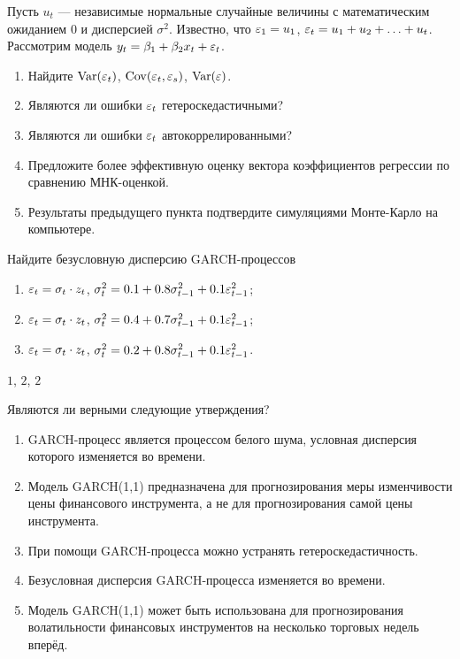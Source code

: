 \begin{problem}
Пусть $u_t$ — независимые нормальные случайные величины с
математическим ожиданием $0$ и дисперсией $\sigma^2$. Известно, что $\varepsilon_1=u_1$, $\varepsilon_t=u_1+u_2+\ldots+u_t$. Рассмотрим модель $y_t=\beta_1+\beta_2 x_t + \varepsilon_t$.

\begin{enumerate}
\item Найдите $\operatorname{Var}(\varepsilon_t)$, $\operatorname{Cov}(\varepsilon_t,\varepsilon_s)$, $\operatorname{Var}(\varepsilon)$.
\item Являются ли ошибки $\varepsilon_t$ гетероскедастичными?
\item Являются ли ошибки $\varepsilon_t$ автокоррелированными?
\item Предложите более эффективную оценку вектора коэффициентов регрессии по сравнению МНК-оценкой.
\item Результаты предыдущего пункта подтвердите симуляциями Монте-Карло на компьютере.
\end{enumerate}


\begin{sol}
\end{sol}
\end{problem}



\begin{problem}
Найдите безусловную дисперсию GARCH-процессов
\begin{enumerate}
\item $\varepsilon_t=\sigma_t \cdot z_t$, $\sigma^2_t=0.1+0.8\sigma^2_{t-1}+0.1\varepsilon^2_{t-1}$;
\item $\varepsilon_t=\sigma_t \cdot z_t$, $\sigma^2_t=0.4+0.7\sigma^2_{t-1}+0.1\varepsilon^2_{t-1}$;
\item $\varepsilon_t=\sigma_t \cdot z_t$, $\sigma^2_t=0.2+0.8\sigma^2_{t-1}+0.1\varepsilon^2_{t-1}$.
\end{enumerate}


\begin{sol}
$1$, $2$, $2$
\end{sol}
\end{problem}



\begin{problem}
Являются ли верными следующие утверждения?
\begin{enumerate}
\item GARCH-процесс является процессом белого шума, условная дисперсия которого
изменяется во времени.
\item Модель GARCH(1,1) предназначена для прогнозирования меры изменчивости цены
финансового инструмента, а не для прогнозирования самой цены инструмента.
\item При помощи GARCH-процесса можно устранять гетероскедастичность.
\item Безусловная дисперсия GARCH-процесса изменяется во времени.
\item Модель GARCH(1,1) может быть использована для прогнозирования
волатильности финансовых инструментов на несколько торговых недель вперёд.
\end{enumerate}


\begin{sol}
\end{sol}
\end{problem}



